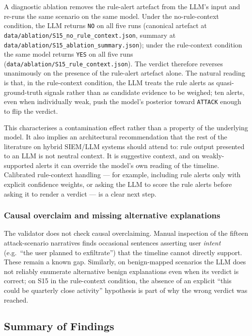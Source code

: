 \documentclass[conference]{IEEEtran}
\begin{document}
A diagnostic ablation removes the rule-alert artefact from the LLM's input and re-runs the same scenario on the same model. Under the no-rule-context condition, the LLM returns \texttt{NO} on all five runs (canonical artefact at \texttt{data/ablation/S15\_no\_rule\_context.json}, summary at \texttt{data/ablation/S15\_ablation\_summary.json}); under the rule-context condition the same model returns \texttt{YES} on all five runs (\texttt{data/ablation/S15\_rule\_context.json}). The verdict therefore reverses unanimously on the presence of the rule-alert artefact alone. The natural reading is that, in the rule-context condition, the LLM treats the rule alerts as quasi-ground-truth signals rather than as candidate evidence to be weighed; ten alerts, even when individually weak, push the model's posterior toward \texttt{ATTACK} enough to flip the verdict.

This characterises a contamination effect rather than a property of the underlying model. It also implies an architectural recommendation that the rest of the literature on hybrid SIEM/LLM systems should attend to: rule output presented to an LLM is not neutral context. It is suggestive context, and on weakly-supported alerts it can override the model's own reading of the timeline. Calibrated rule-context handling --- for example, including rule alerts only with explicit confidence weights, or asking the LLM to score the rule alerts before asking it to render a verdict --- is a clear next step.

\subsubsection*{Causal overclaim and missing alternative explanations}

The validator does not check causal overclaiming. Manual inspection of the fifteen attack-scenario narratives finds occasional sentences asserting user \emph{intent} (e.g.\ ``the user planned to exfiltrate'') that the timeline cannot directly support. These remain a known gap. Similarly, on benign-mapped scenarios the LLM does not reliably enumerate alternative benign explanations even when its verdict is correct; on S15 in the rule-context condition, the absence of an explicit ``this could be quarterly close activity'' hypothesis is part of why the wrong verdict was reached.

\subsection{Summary of Findings}
\label{sec:summary}
\end{document}
